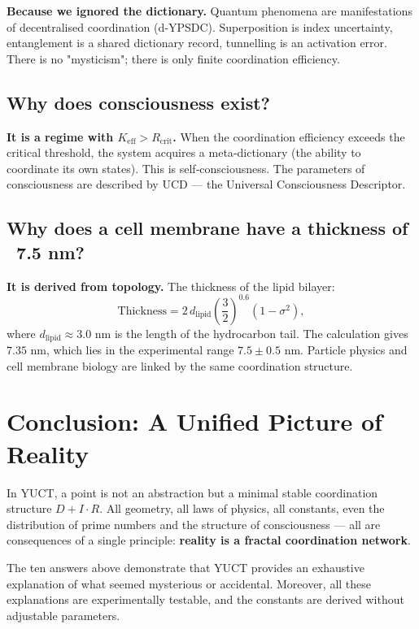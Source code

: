 \documentclass[12pt,a4paper]{article}
\newcommand{\Keff}{K_{\mathrm{eff}}}
\newcommand{\Rcrit}{R_{\mathrm{crit}}}
\begin{document}
	\textbf{Because we ignored the dictionary.} Quantum phenomena are manifestations of decentralised coordination (d‑YPSDC). Superposition is index uncertainty, entanglement is a shared dictionary record, tunnelling is an activation error. There is no "mysticism"; there is only finite coordination efficiency.
	
	\subsection{Why does consciousness exist?}
	
	\textbf{It is a regime with \(\Keff > \Rcrit\).} When the coordination efficiency exceeds the critical threshold, the system acquires a meta‑dictionary (the ability to coordinate its own states). This is self‑consciousness. The parameters of consciousness are described by UCD — the Universal Consciousness Descriptor.
	
	\subsection{Why does a cell membrane have a thickness of ~7.5 nm?}
	
	\textbf{It is derived from topology.} The thickness of the lipid bilayer:
	\[
	\text{Thickness} = 2 \, d_{\mathrm{lipid}} \left(\frac{3}{2}\right)^{0.6} (1 - \sigma^2),
	\]
	where \(d_{\mathrm{lipid}} \approx 3.0\) nm is the length of the hydrocarbon tail. The calculation gives \(7.35\) nm, which lies in the experimental range \(7.5 \pm 0.5\) nm. Particle physics and cell membrane biology are linked by the same coordination structure.
	
	\section{Conclusion: A Unified Picture of Reality}
	
	In YUCT, a point is not an abstraction but a minimal stable coordination structure \(D+I\cdot R\). All geometry, all laws of physics, all constants, even the distribution of prime numbers and the structure of consciousness — all are consequences of a single principle: \textbf{reality is a fractal coordination network}.
	
	The ten answers above demonstrate that YUCT provides an exhaustive explanation of what seemed mysterious or accidental. Moreover, all these explanations are experimentally testable, and the constants are derived without adjustable parameters.
	
\end{document}
